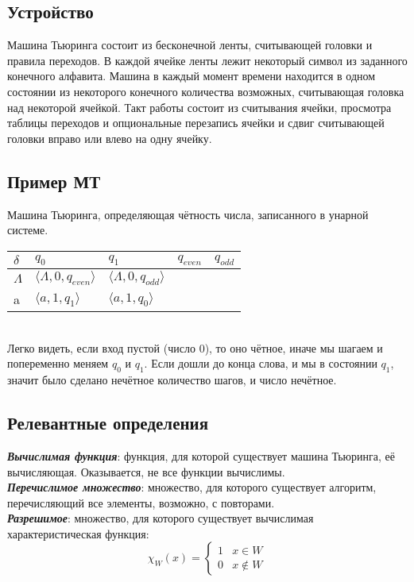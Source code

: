 \documentclass{article}
\begin{document}
\subsection{Устройство}
Машина Тьюринга состоит из бесконечной ленты, считывающей головки и правила переходов. В каждой ячейке ленты лежит некоторый символ из заданного конечного алфавита. Машина в каждый момент времени находится в одном состоянии из некоторого конечного количества возможных, считывающая головка над некоторой ячейкой. Такт работы состоит из считывания ячейки, просмотра таблицы переходов и опциональные перезапись ячейки и сдвиг считывающей головки вправо или влево на одну ячейку. \\
\newpage
\subsection{Пример МТ}
Машина Тьюринга, определяющая чётность числа, записанного в унарной системе. 
\medskip \\
\begin{tabular}{ | l | l | l | l | l |}
	\hline
	 $\delta$ & $q_0$ & $q_1$ & $q_{even}$ & $q_{odd}$  \\ \hline
	 $\Lambda$ & $\langle \Lambda, 0, q_{even} \rangle$ & $\langle \Lambda, 0, q_{odd} \rangle $& & \\ \hline
	 a & $\langle a, 1, q_1 \rangle$ &  $\langle a, 1, q_0 \rangle$ & & \\ 
    \hline 
\end{tabular} 
\medskip \\
Легко видеть, если вход пустой (число $0$), то оно чётное, иначе мы шагаем и попеременно меняем $q_0$ и $q_1$. Если дошли до конца слова, и мы в состоянии $q_1$, значит было сделано нечётное количество шагов, и число нечётное. 
\subsection{Релевантные определения}
\textbf{\textit{Вычислимая функция}}: функция, для которой существует машина Тьюринга, её вычисляющая. Оказывается, не все функции вычислимы. \\
\textbf{\textit{Перечислимое множество}}: множество, для которого существует алгоритм, перечисляющий все элементы, возможно, с повторами. \\
\textbf{\textit{Разрешимое}}: множество, для которого существует вычислимая характеристическая функция: 
\[
\chi_{W}(x) = \left\{
\begin{array}{cc}
1 & x \in W \\
0 & x \not \in W 
\end{array} \right. 
\]
\end{document}
